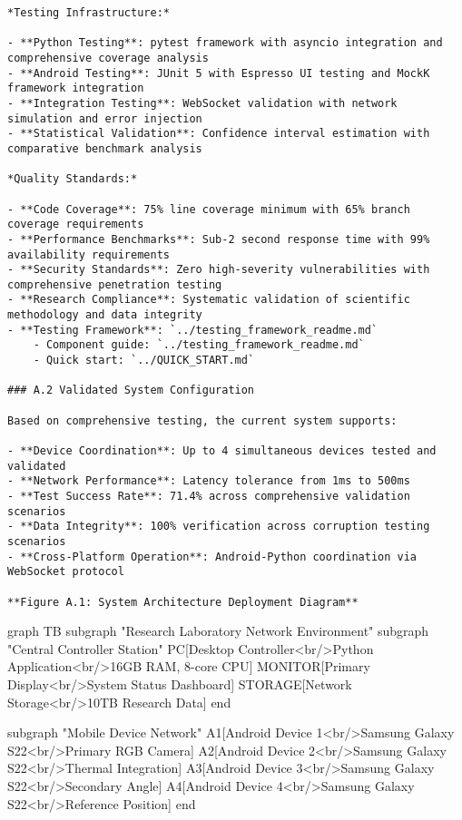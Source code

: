 \documentclass[12pt,a4paper]{report}
\begin{document}
\begin{verbatim}
*Testing Infrastructure:*

- **Python Testing**: pytest framework with asyncio integration and comprehensive coverage analysis
- **Android Testing**: JUnit 5 with Espresso UI testing and MockK framework integration
- **Integration Testing**: WebSocket validation with network simulation and error injection
- **Statistical Validation**: Confidence interval estimation with comparative benchmark analysis

*Quality Standards:*

- **Code Coverage**: 75% line coverage minimum with 65% branch coverage requirements
- **Performance Benchmarks**: Sub-2 second response time with 99% availability requirements
- **Security Standards**: Zero high-severity vulnerabilities with comprehensive penetration testing
- **Research Compliance**: Systematic validation of scientific methodology and data integrity
- **Testing Framework**: `../testing_framework_readme.md`
    - Component guide: `../testing_framework_readme.md`
    - Quick start: `../QUICK_START.md`

### A.2 Validated System Configuration

Based on comprehensive testing, the current system supports:

- **Device Coordination**: Up to 4 simultaneous devices tested and validated
- **Network Performance**: Latency tolerance from 1ms to 500ms
- **Test Success Rate**: 71.4% across comprehensive validation scenarios
- **Data Integrity**: 100% verification across corruption testing scenarios
- **Cross-Platform Operation**: Android-Python coordination via WebSocket protocol

**Figure A.1: System Architecture Deployment Diagram**

\end{verbatim}
graph TB
    subgraph "Research Laboratory Network Environment"
        subgraph "Central Controller Station"
            PC[Desktop Controller<br/>Python Application<br/>16GB RAM, 8-core CPU]
            MONITOR[Primary Display<br/>System Status Dashboard]
            STORAGE[Network Storage<br/>10TB Research Data]
        end

        subgraph "Mobile Device Network"
            A1[Android Device 1<br/>Samsung Galaxy S22<br/>Primary RGB Camera]
            A2[Android Device 2<br/>Samsung Galaxy S22<br/>Thermal Integration]
            A3[Android Device 3<br/>Samsung Galaxy S22<br/>Secondary Angle]
            A4[Android Device 4<br/>Samsung Galaxy S22<br/>Reference Position]
        end
\end{document}
